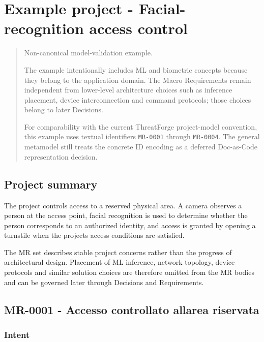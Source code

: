\documentclass[
  10pt,
]{article}
\author{}
\date{}
\begin{document}
\section{Example project - Facial-recognition access
control}\label{example-project---facial-recognition-access-control}

\begin{quote}
Non-canonical model-validation example.

The example intentionally includes ML and biometric concepts because
they belong to the application domain. The Macro Requirements remain
independent from lower-level architecture choices such as inference
placement, device interconnection and command protocols; those choices
belong to later Decisions.

For comparability with the current ThreatForge project-model convention,
this example uses textual identifiers \texttt{MR-0001} through
\texttt{MR-0004}. The general metamodel still treats the concrete ID
encoding as a deferred Doc-as-Code representation decision.
\end{quote}

\subsection{Project summary}\label{project-summary}

The project controls access to a reserved physical area. A camera
observes a person at the access point, facial recognition is used to
determine whether the person corresponds to an authorized identity, and
access is granted by opening a turnstile when the
project\textquotesingle s access conditions are satisfied.

The MR set describes stable project concerns rather than the progress of
architectural design. Placement of ML inference, network topology,
device protocols and similar solution choices are therefore omitted from
the MR bodies and can be governed later through Decisions and
Requirements.

\subsection{MR-0001 - Accesso controllato all\textquotesingle area
riservata}\label{mr-0001---accesso-controllato-allarea-riservata}

\subsubsection{Intent}\label{intent}
\end{document}
